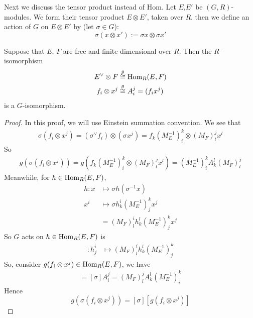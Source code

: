 \documentclass{article}
\begin{document}
Next we discuss the tensor product instead of Hom. Let $E$,$E'$ be
$(G,R)$-modules. We form their tensor product $E\otimes E'$, taken over
$R$. then we define an action of $G$ on $E\otimes E'$ by (let
$\sigma\in G$):
\begin{equation}
    \sigma (x\otimes x') := \sigma x \otimes \sigma x'
\end{equation}

\begin{fact}
\label{fact:Ev-F--Hom-G}
Suppose that $E$, $F$ are free and finite dimensional over $R$. Then
the $R$-isomorphism
\begin{align}
    E^\vee \otimes F &\overset{g}{\cong} \operatorname{Hom}_R(E,F) \\
    f_i \otimes x^j &\overset{g}{\cong} A^j_i = (f_i x^j)
    \label{eq:fx-g-aji}
\end{align}
is a $G$-isomorphism.
\end{fact}
\begin{proof} 
In this proof, we will use Einstein summation
convention. We see that
\begin{align}
    \sigma (f_i\otimes x^j) = (\sigma^\vee f_i )\otimes (\sigma x^j) =
    f_k (M_E^{-1})^k_i \otimes (M_F)^j_l x^l 
\end{align}
So
\begin{align}
    g(\sigma (f_i\otimes x^j)) = g(f_k (M_E^{-1})^k_i \otimes 
    (M_F)^j_l x^l) = (M^{-1}_E)^k_i A_k^l (M_F)^j_l
\end{align}
Meanwhile, for $h\in \operatorname{Hom}_R(E,F)$,
\begin{align}
    [\sigma] h: x &\mapsto \sigma h(\sigma^{-1} x) \\
    x^i &\mapsto \sigma h^i_k (M_E^{-1})^k_j x^j \\
    &= (M_F)^i_l h^l_k (M_E^{-1})^k_j x^j
\end{align}
So $G$ acts on $h\in \operatorname{Hom}_R(E,F)$ is
\begin{align}
    [\sigma]: h^i_j &\mapsto  (M_F)^i_l h^l_k (M_E^{-1})^k_j
\end{align}
So, consider $g(f_i\otimes x^j)\in \operatorname{Hom}_R(E,F)$, we have
\begin{align*}
    [\sigma] [g (f_i\otimes x^j)] = [\sigma] A^j_i = (M_F)^j_l A^l_k
    (M_E^{-1})^k_i
\end{align*}
Hence
\begin{equation}
    \label{eq:g-iso-sggs}
    g(\sigma (f_i\otimes x^j )) = [\sigma] [g(f_i\otimes x^j)]
\end{equation}
\end{proof}
\end{document}
